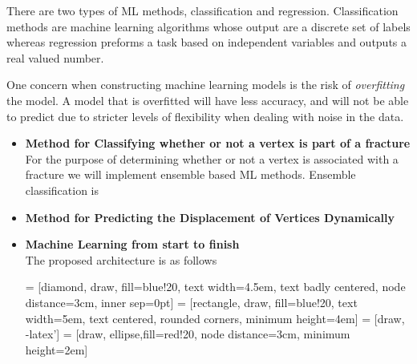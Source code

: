 \begin{itemize}
There are two types of ML methods, classification and regression. Classification methods are machine learning algorithms whose output are a discrete set of labels whereas regression preforms a task based on independent variables and outputs a real valued number. 

One concern when constructing machine learning models is the risk of \textit{overfitting} the model. A model that is overfitted will have less accuracy, and will not be able to predict due to stricter levels of flexibility when dealing with noise in the data. 




\begin{itemize}
\bigskip
\item \textbf{Method for Classifying whether or not a vertex is part of a fracture}
\bigskip
\\
For the purpose of determining whether or not a vertex is associated with a fracture we will implement ensemble based ML methods. Ensemble classification is 


\item \textbf{Method for Predicting the Displacement of Vertices Dynamically}
\bigskip
\\


\item \textbf{Machine Learning from start to finish}
\bigskip
\\
The proposed architecture is as follows

 = [diamond, draw, fill=blue!20, 
    text width=4.5em, text badly centered, node distance=3cm, inner sep=0pt]
 = [rectangle, draw, fill=blue!20, 
    text width=5em, text centered, rounded corners, minimum height=4em]
 = [draw, -latex']
 = [draw, ellipse,fill=red!20, node distance=3cm,
    minimum height=2em]
    
\end{itemize}
\end{itemize}
